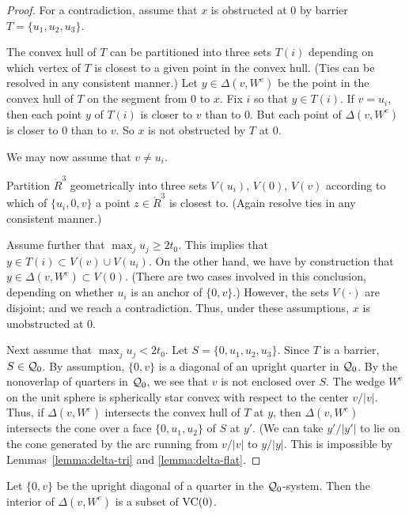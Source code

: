 \begin{proof} For a contradiction, assume that $x$ is obstructed
at $0$ by barrier $T =\{u_1,u_2,u_3\}$.


The convex hull of $T$ can be partitioned into three sets $T(i)$
depending on which vertex of $T$ is closest to a given point in
the convex hull. (Ties can be resolved in any consistent manner.)
Let $y\in \Delta(v,W^e)$ be the point in the convex hull of $T$ on
the segment from $0$ to $x$.  Fix $i$ so that $y\in T(i)$. If
$v=u_i$, then each point $y$ of $T(i)$ is closer to $v$ than to
$0$.  But each point of $\Delta(v,W^e)$ is closer to $0$ than to
$v$.  So $x$ is not obstructed by $T$ at $0$.

We may now assume that $v\ne u_i$.

Partition $\ring{R}^3$ geometrically into three sets $V(u_i)$,
$V(0)$, $V(v)$ according to which of $\{u_i,0,v\}$ a point
$z\in\ring{R}^3$ is closest to.  (Again resolve ties in any
consistent manner.)

Assume further that $\max_j u_j \ge 2t_0$. This implies that $y\in
T(i) \subset V(v) \cup V(u_i)$.  On the other hand, we have by
construction that $y\in \Delta(v,W^e) \subset V(0)$.  (There are
two cases involved in this conclusion, depending on whether $u_i$
is an anchor of $\{0,v\}$.)  However, the sets $V(\cdot)$ are
disjoint; and we reach a contradiction.  Thus, under these
assumptions, $x$ is unobstructed at $0$.

Next assume that $\max_j u_j < 2t_0$.  Let $S=\{0,u_1,u_2,u_3\}$.
Since $T$ is a barrier, $S\in{\mathcal Q}_0$.  By assumption, $\{0,v\}$
is a diagonal of an upright quarter in ${\mathcal Q}_0$.  By the
nonoverlap of quarters in ${\mathcal Q}_0$, we see that $v$ is not
enclosed over $S$. The wedge $W^e$ on the unit sphere is
spherically star convex with respect to the center $v/|v|$.  Thus,
if $\Delta(v,W^e)$ intersects the convex hull of $T$ at $y$, then
$\Delta(v,W^e)$ intersects the cone over a face $\{0,u_1,u_2\}$ of
$S$ at $y'$. (We can take $y'/|y'|$ to lie on the cone generated
by the arc running from $v/|v|$ to $y/|y|$. This is impossible by
Lemmas~\ref{lemma:delta-tri} and \ref{lemma:delta-flat}.
\end{proof}

\begin{lemma}  Let $\{0,v\}$ be the upright diagonal of a quarter
in the ${\mathcal Q}_0$-system.  Then the interior of $\Delta(v,W^e)$ is
a subset of ${\operatorname{VC}}(0)$.
\end{lemma}

